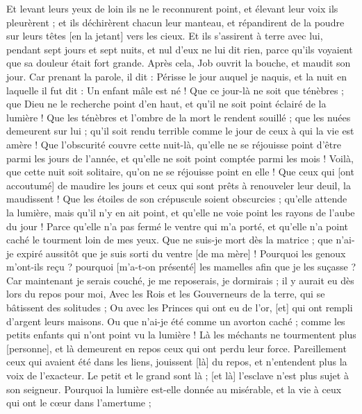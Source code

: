 \begin{multicols}{2}
Et levant leurs yeux de loin ils ne le reconnurent point, et élevant leur voix ils pleurèrent ; et ils déchirèrent chacun leur manteau, et répandirent de la poudre sur leurs têtes [en la jetant] vers les cieux.
Et ils s'assirent à terre avec lui, pendant sept jours et sept nuits, et nul d'eux ne lui dit rien, parce qu'ils voyaient que sa douleur était fort grande.
\VerseOne{}Après cela, Job ouvrit la bouche, et maudit son jour.
Car prenant la parole, il dit :
Périsse le jour auquel je naquis, et la nuit en laquelle il fut dit : Un enfant mâle est né !
Que ce jour-là ne soit que ténèbres ; que Dieu ne le recherche point d'en haut, et qu'il ne soit point éclairé de la lumière !
Que les ténèbres et l'ombre de la mort le rendent souillé ; que les nuées demeurent sur lui ; qu'il soit rendu terrible comme le jour de ceux à qui la vie est amère !
Que l'obscurité couvre cette nuit-là, qu'elle ne se réjouisse point d'être parmi les jours de l'année, et qu'elle ne soit point comptée parmi les mois !
Voilà, que cette nuit soit solitaire, qu'on ne se réjouisse point en elle !
Que ceux qui [ont accoutumé] de maudire les jours et ceux qui sont prêts à renouveler leur deuil, la maudissent !
Que les étoiles de son crépuscule soient obscurcies ; qu'elle attende la lumière, mais qu'il n'y en ait point, et qu'elle ne voie point les rayons de l'aube du jour !
Parce qu'elle n'a pas fermé le ventre qui m'a porté, et qu'elle n'a point caché le tourment loin de mes yeux.
Que ne suis-je mort dès la matrice ; que n'ai-je expiré aussitôt que je suis sorti du ventre [de ma mère] !
Pourquoi les genoux m'ont-ils reçu ? pourquoi [m'a-t-on présenté] les mamelles afin que je les suçasse ?
Car maintenant je serais couché, je me reposerais, je dormirais ; il y aurait eu dès lors du repos pour moi,
Avec les Rois et les Gouverneurs de la terre, qui se bâtissent des solitudes ;
Ou avec les Princes qui ont eu de l'or, [et] qui ont rempli d'argent leurs maisons.
Ou que n'ai-je été comme un avorton caché ; comme les petits enfants qui n'ont point vu la lumière !
Là les méchants ne tourmentent plus [personne], et là demeurent en repos ceux qui ont perdu leur force.
Pareillement ceux qui avaient été dans les liens, jouissent [là] du repos, et n'entendent plus la voix de l'exacteur.
Le petit et le grand sont là ; [et là] l'esclave n'est plus sujet à son seigneur.
Pourquoi la lumière est-elle donnée au misérable, et la vie à ceux qui ont le cœur dans l'amertume ;

\end{multicols}
